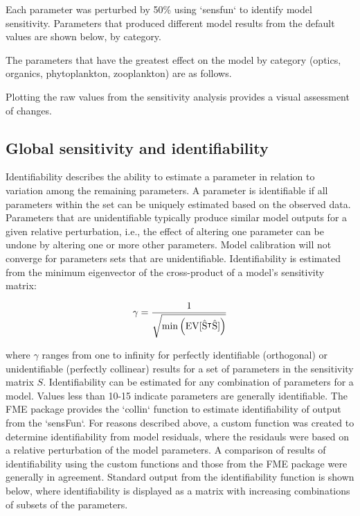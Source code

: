 \documentclass[letterpaper,12pt,oneside]{article}\usepackage[]{graphicx}\usepackage[]{color}
\begin{document}
Each parameter was perturbed by 50\% using `sensfun` to identify model sensitivity.  Parameters that produced different model results from the default values are shown below, by category. 

The parameters that have the greatest effect on the model by category (optics, organics, phytoplankton, zooplankton) are as follows.

Plotting the raw values from the sensitivity analysis provides a visual assessment of changes.

\subsection{Global sensitivity and identifiability}

Identifiability describes the ability to estimate a parameter in relation to variation among the remaining parameters.  A parameter is identifiable if all parameters within the set can be uniquely estimated based on the observed data.  Parameters that are unidentifiable typically produce similar model outputs for a given relative perturbation, i.e., the effect of altering one parameter can be undone by altering one or more other parameters.  Model calibration will not converge for parameters sets that are unidentifiable.  Identifiability is estimated from the minimum eigenvector of the cross-product of a model's sensitivity matrix:

\begin{equation}
\gamma = \frac{1} {\sqrt{ \min \left(\rm{EV}[\hat{S}^\intercal \hat{S}]\right)}}
\end{equation}

where $\gamma$ ranges from one to infinity for perfectly identifiable (orthogonal) or unidentifiable (perfectly collinear) results for a set of parameters in the sensitivity matrix $S$.  Identifiability can be estimated for any combination of parameters for a model.  Values less than 10-15 indicate parameters are generally identifiable.  The FME package provides the `collin` function to estimate identifiability of output from the `sensFun`.  For reasons described above, a custom function was created to determine identifiability from model residuals, where the residauls were based on a relative perturbation of the model parameters.  A comparison of results of identifiability using the custom functions and those from the FME package were generally in agreement.  Standard output from the identifiability function is shown below, where identifiability is displayed as a matrix with increasing combinations of subsets of the parameters.    
\end{document}
